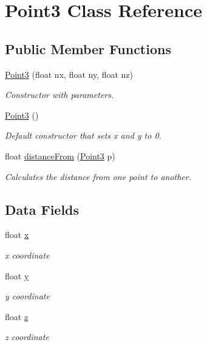 \hypertarget{class_point3}{}\section{Point3 Class Reference}
\label{class_point3}
\subsection*{Public Member Functions}
\begin{DoxyCompactItemize}
\item 
\mbox{\hyperlink{class_point3_a10d1874b1185837440a6a21d65b6cfbb}{Point3}} (float nx, float ny, float nz)
\begin{DoxyCompactList}\small\item\em Constructor with parameters. \end{DoxyCompactList}\item 
\mbox{\hyperlink{class_point3_a9a22451b2dd7f2b26ad5a3e9b74c8eca}{Point3}} ()
\begin{DoxyCompactList}\small\item\em Default constructor that sets x and y to 0. \end{DoxyCompactList}\item 
float \mbox{\hyperlink{class_point3_ae8c8f4565b4b17a1beee93f217954735}{distance\+From}} (\mbox{\hyperlink{class_point3}{Point3}} p)
\begin{DoxyCompactList}\small\item\em Calculates the distance from one point to another. \end{DoxyCompactList}\end{DoxyCompactItemize}
\subsection*{Data Fields}
\begin{DoxyCompactItemize}
\item 
float \mbox{\hyperlink{class_point3_a12b90b9f335499323488109dfef2c46a}{x}}
\begin{DoxyCompactList}\small\item\em x coordinate \end{DoxyCompactList}\item 
float \mbox{\hyperlink{class_point3_a9435368d0f1118d35f751aa1d4e4d4e5}{y}}
\begin{DoxyCompactList}\small\item\em y coordinate \end{DoxyCompactList}\item 
float \mbox{\hyperlink{class_point3_a56a0faf09fb6bd6602f157c6dd3db7ff}{z}}
\begin{DoxyCompactList}\small\item\em z coordinate \end{DoxyCompactList}\end{DoxyCompactItemize}
